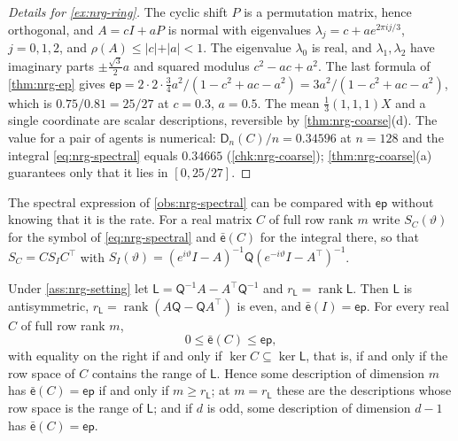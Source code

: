 \begin{proof}[Details for \cref{ex:nrg-ring}]
The cyclic shift $P$ is a permutation matrix, hence orthogonal, and $A=cI+aP$ is normal with eigenvalues $\lambda_j=c+ae^{2\pi ij/3}$, $j=0,1,2$, and $\rho(A)\le\vert c\vert+\vert a\vert<1$. The eigenvalue $\lambda_0$ is real, and $\lambda_1,\lambda_2$ have imaginary parts $\pm\tfrac{\sqrt3}2a$ and squared modulus $c^2-ac+a^2$. The last formula of \cref{thm:nrg-ep} gives $\mathsf{ep}=2\cdot2\cdot\tfrac34a^2/(1-c^2+ac-a^2)=3a^2/(1-c^2+ac-a^2)$, which is $0.75/0.81=25/27$ at $c=0.3$, $a=0.5$. The mean $\tfrac13(1,1,1)X$ and a single coordinate are scalar descriptions, reversible by \cref{thm:nrg-coarse}(d). The value for a pair of agents is numerical: $\mathsf D_n(C)/n=0.34596$ at $n=128$ and the integral \cref{eq:nrg-spectral} equals $0.34665$ (\cref{chk:nrg-coarse}); \cref{thm:nrg-coarse}(a) guarantees only that it lies in $[0,25/27]$.
\end{proof}

The spectral expression of \cref{obs:nrg-spectral} can be compared with $\mathsf{ep}$ without knowing that it is the rate. For a real matrix $C$ of full row rank $m$ write $S_C(\vartheta)$ for the symbol of \cref{eq:nrg-spectral} and $\bar{\mathsf e}(C)$ for the integral there, so that $S_C=CS_IC^\top$ with $S_I(\vartheta)=(e^{i\vartheta}I-A)^{-1}\mathsf Q(e^{-i\vartheta}I-A^\top)^{-1}$.

\begin{proposition}\label{prop:nrg-lossless}
Under \cref{ass:nrg-setting} let $\mathsf L=\mathsf Q^{-1}A-A^\top\mathsf Q^{-1}$ and $r_{\mathsf L}=\operatorname{rank}\mathsf L$. Then $\mathsf L$ is antisymmetric, $r_{\mathsf L}=\operatorname{rank}(A\mathsf Q-\mathsf QA^\top)$ is even, and $\bar{\mathsf e}(I)=\mathsf{ep}$. For every real $C$ of full row rank $m$,
\[ 0\le\bar{\mathsf e}(C)\le\mathsf{ep}, \]
with equality on the right if and only if $\ker C\subseteq\ker\mathsf L$, that is, if and only if the row space of $C$ contains the range of $\mathsf L$. Hence some description of dimension $m$ has $\bar{\mathsf e}(C)=\mathsf{ep}$ if and only if $m\ge r_{\mathsf L}$; at $m=r_{\mathsf L}$ these are the descriptions whose row space is the range of $\mathsf L$; and if $d$ is odd, some description of dimension $d-1$ has $\bar{\mathsf e}(C)=\mathsf{ep}$.
\end{proposition}


